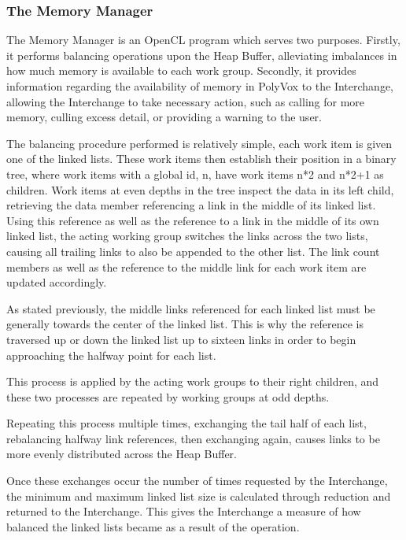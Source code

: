 \documentclass[onecolumn, draftclsnofoot,10pt, compsoc]{IEEEtran}
\begin{document}
\subsubsection{The Memory Manager}

The Memory Manager is an OpenCL program which serves two purposes. Firstly, it performs balancing operations upon the Heap Buffer, alleviating imbalances in how much memory is available to each work group. Secondly, it provides information regarding the availability of memory in PolyVox to the Interchange, allowing the Interchange to take necessary action, such as calling for more memory, culling excess detail, or providing a warning to the user.

The balancing procedure performed is relatively simple, each work item is given one of the linked lists. These work items then establish their position in a binary tree, where work items with a global id, n, have work items n*2 and n*2+1 as children. Work items at even depths in the tree inspect the data in its left child, retrieving the data member referencing a link in the middle of its linked list. Using this reference as well as the reference to a link in the middle of its own linked list, the acting working group switches the links across the two lists, causing all trailing links to also be appended to the other list. The link count members as well as the reference to the middle link for each work item are updated accordingly.

As stated previously, the middle links referenced for each linked list must be generally towards the center of the linked list. This is why the reference is traversed up or down the linked list up to sixteen links in order to begin approaching the halfway point for each list.

This process is applied by the acting work groups to their right children, and these two processes are repeated by working groups at odd depths.

Repeating this process multiple times, exchanging the tail half of each list, rebalancing halfway link references, then exchanging again, causes links to be more evenly distributed across the Heap Buffer.

Once these exchanges occur the number of times requested by the Interchange, the minimum and maximum linked list size is calculated through reduction and returned to the Interchange. This gives the Interchange a measure of how balanced the linked lists became as a result of the operation.\\
\end{document}
